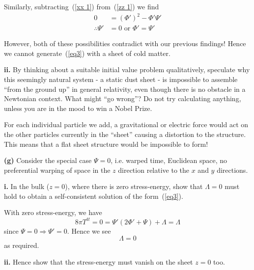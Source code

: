 \documentclass[a4paper]{article} %
\begin{document}
Similarly, subtracting~(\ref{xx 1}) from~(\ref{zz 1}) we find
\begin{align}
0&=(\Phi')^2-\Phi' \Psi'\\
\therefore \Psi'&=0 \text{ or } \Phi'=\Psi'
\end{align}

However, both of these possibilities contradict with our previous findings! Hence we cannot generate~(\ref{eq3}) with a sheet of cold matter.


\begin{framed}
\textbf{ii.} By thinking about a suitable initial value problem qualitatively, speculate why this seemingly natural system - a static dust sheet - is impossible to assemble ``from the ground up'' in general relativity, even though there is no obstacle in a Newtonian context. What might ``go wrong''? Do not try calculating anything, unless you are in the mood to win a Nobel Prize.
\end{framed}

For each individual particle we add, a gravitational or electric force would act on the other particles currently in the ``sheet'' causing a distortion to the structure. This means that a flat sheet structure would be impossible to form!


\begin{framed}
\textbf{(g)} Consider the special case $\Psi=0$, i.e. warped time, Euclidean space, no preferential
warping of space in the $z$ direction relative to the $x$ and $y$ directions.
\end{framed}

\begin{framed}
\textbf{i.} In the bulk ($z=0$), where there is zero stress-energy, show that $\Lambda=0$ must
hold to obtain a self-consistent solution of the form~(\ref{eq3}).
\end{framed}

With zero stress-energy, we have
\begin{equation}
8\pi T^{tt}=0=\Psi'(2\Phi' + \Psi) + \Lambda = \Lambda
\end{equation}
since $\Psi=0\Rightarrow \Psi'=0$. Hence we see
\begin{equation}
\Lambda = 0
\end{equation}
as required.


\begin{framed}
\textbf{ii.} Hence show that the stress-energy must vanish on the sheet $z = 0$ too.
\end{framed}
\end{document}
